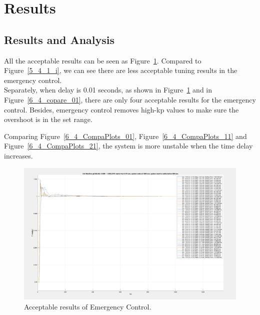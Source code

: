 \section{Results} %
\subsection{Results and Analysis} %

All the acceptable results can be seen as Figure~\ref{6_4_i}. Compared to Figure~\ref{5_4_1_i}, we can see there are less acceptable tuning results in the emergency control.\\

Separately, when delay is 0.01 seconds, as shown in Figure~\ref{6_4_i} and in Figure~\ref{6_4_copare_01}, there are only four acceptable results for the emergency control. Besides, emergency control removes high-kp values to make sure the overshoot is in the set range.

Comparing Figure~\ref{6_4_CompaPlots_01}, Figure~\ref{6_4_CompaPlots_11} and Figure~\ref{6_4_CompaPlots_21}, the system is more unstable when the time delay increases.

\begin{figure}[htbp]
\centering
\includegraphics[width = .891\textwidth]{figure/6_4_i.png}
\caption{Acceptable results of Emergency Control.}
\label{6_4_i}
\end{figure}

